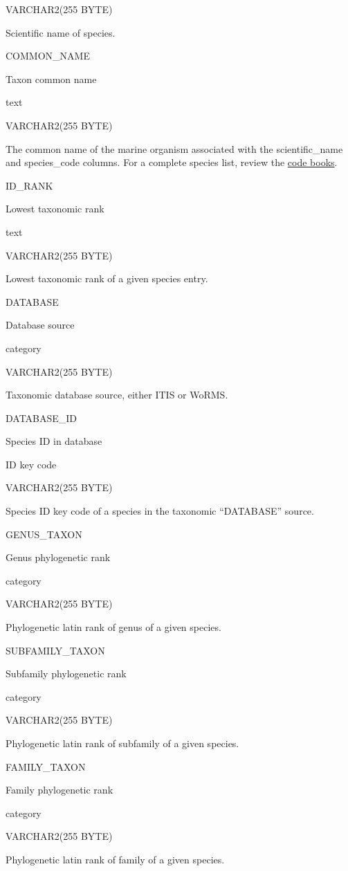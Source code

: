 \documentclass[
  letterpaper,
  oneside,
  open=any]{scrbook}
\begin{document}
VARCHAR2(255 BYTE)

Scientific name of species.

COMMON\_NAME

Taxon common name

text

VARCHAR2(255 BYTE)

The common name of the marine organism associated with the
scientific\_name and species\_code columns. For a complete species list,
review the
\href{https://www.fisheries.noaa.gov/resource/document/groundfish-survey-species-code-manual-and-data-codes-manual}{code
books}.

ID\_RANK

Lowest taxonomic rank

text

VARCHAR2(255 BYTE)

Lowest taxonomic rank of a given species entry.

DATABASE

Database source

category

VARCHAR2(255 BYTE)

Taxonomic database source, either ITIS or WoRMS.

DATABASE\_ID

Species ID in database

ID key code

VARCHAR2(255 BYTE)

Species ID key code of a species in the taxonomic ``DATABASE'' source.

GENUS\_TAXON

Genus phylogenetic rank

category

VARCHAR2(255 BYTE)

Phylogenetic latin rank of genus of a given species.

SUBFAMILY\_TAXON

Subfamily phylogenetic rank

category

VARCHAR2(255 BYTE)

Phylogenetic latin rank of subfamily of a given species.

FAMILY\_TAXON

Family phylogenetic rank

category

VARCHAR2(255 BYTE)

Phylogenetic latin rank of family of a given species.
\end{document}

